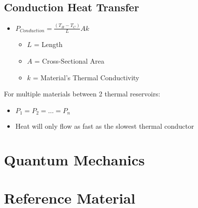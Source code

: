 \documentclass[10pt,letterpaper,final,twoside,notitlepage]{article}
\numberwithin{equation}{section} %
\begin{document}
	\subsection*{Conduction Heat Transfer} \label{subsec:Conduction Heat Transfer}
	\begin{itemize}[noitemsep, nolistsep]
		\item $P_{Conduction} = \frac{\left( T_{H} - T_{C} \right)}{L} Ak$
		\begin{itemize}[noitemsep, nolistsep]
			\item $L$ = Length
			\item $A$ = Cross-Sectional Area
			\item $k$ = Material's Thermal Conductivity
		\end{itemize}
	\end{itemize}
	For multiple materials between 2 thermal reservoirs:
	\begin{itemize}[noitemsep, nolistsep]
		\item $P_{1} = P_{2} = \ldots = P_{n}$
		\item Heat will only flow as fast as the slowest thermal conductor
	\end{itemize}

\section{Quantum Mechanics} \label{sec:Quantum Mech}

\appendix
\section{Reference Material} \label{sec:Reference Material}


\end{document}
